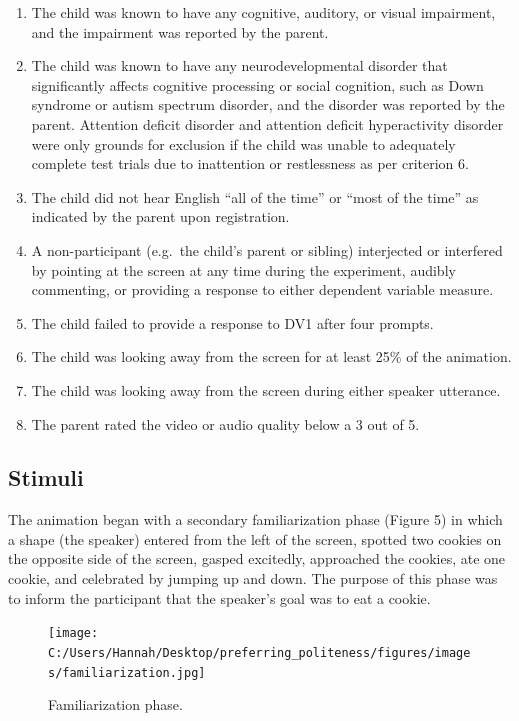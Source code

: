 \documentclass[
  english,
  man,floatsintext]{apa6}
\begin{document}
\begin{enumerate}
\def\labelenumi{\arabic{enumi}.}
\item
  The child was known to have any cognitive, auditory, or visual impairment, and the impairment was reported by the parent.
\item
  The child was known to have any neurodevelopmental disorder that significantly affects cognitive processing or social cognition, such as Down syndrome or autism spectrum disorder, and the disorder was reported by the parent. Attention deficit disorder and attention deficit hyperactivity disorder were only grounds for exclusion if the child was unable to adequately complete test trials due to inattention or restlessness as per criterion 6.
\item
  The child did not hear English ``all of the time'' or ``most of the time'' as indicated by the parent upon registration.
\item
  A non-participant (e.g.~the child's parent or sibling) interjected or interfered by pointing at the screen at any time during the experiment, audibly commenting, or providing a response to either dependent variable measure.
\item
  The child failed to provide a response to DV1 after four prompts.
\item
  The child was looking away from the screen for at least 25\% of the animation.
\item
  The child was looking away from the screen during either speaker utterance.
\item
  The parent rated the video or audio quality below a 3 out of 5.
\end{enumerate}

\hypertarget{stimuli}{%
\subsection{Stimuli}\label{stimuli}}

The animation began with a secondary familiarization phase (Figure 5) in which a shape (the speaker) entered from the left of the screen, spotted two cookies on the opposite side of the screen, gasped excitedly, approached the cookies, ate one cookie, and celebrated by jumping up and down. The purpose of this phase was to inform the participant that the speaker's goal was to eat a cookie.

\begin{figure}
\centering
\texttt{[image: C:/Users/Hannah/Desktop/preferring\_politeness/figures/images/familiarization.jpg]}
\caption{Familiarization phase.}
\end{figure}
\end{document}
